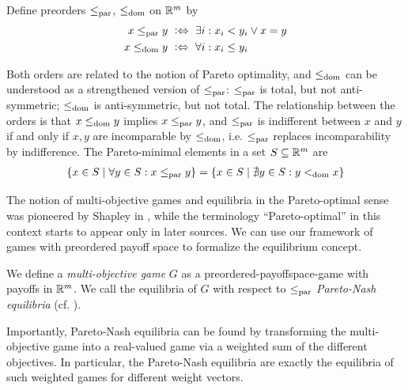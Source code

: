 \documentclass[a4paper]{scrreprt}
\begin{document}
    \begin{defn}
        Define preorders $\leq_{\text{par}}$, $\leq_{\text{dom}}$ on $\mathbb{R}^m$ by
        \begin{align*}
        	x \leq_{\text{par}} y ~ & \mathrel{\vcentcolon\Leftrightarrow}~ \exists i: x_i < y_i \vee x = y \\
        	x \leq_{\text{dom}} y ~    & \mathrel{\vcentcolon\Leftrightarrow}~ \forall i: x_i \leq y_i
        \end{align*}
    \end{defn}
    Both orders are related to the notion of Pareto optimality, and $\leq_{\text{dom}}$ can be understood as a strengthened version of $\leq_{\text{par}}$:
    $\leq_{\text{par}}$ is total, but not anti-symmetric; $\leq_{\text{dom}}$ is anti-symmetric, but not total.
    The relationship between the orders is that $x \leq_{\text{dom}} y$ implies $x \leq_{\text{par}} y$,
    and $\leq_{\text{par}}$ is indifferent between $x$ and $y$ if and only if $x, y$ are incomparable by $\leq_{\text{dom}}$, i.e. $\leq_{\text{par}}$ replaces incomparability by indifference.
    The Pareto-minimal elements in a set $S \subseteq \mathbb{R}^m$ are
    \begin{gather*}
        \{x \in S \mid \forall y \in S: x \leq_{\text{par}} y\} = \{x \in S \mid \nexists y \in S: y <_{\text{dom}} x\}
    \end{gather*}    
    
    The notion of multi-objective games and equilibria in the Pareto-optimal sense was pioneered by Shapley in \cite{bib:shapleyMultiobjectiveEquilibriumPoints},
    while the terminology “Pareto-optimal” in this context starts to appear only in later sources. %
    We can use our framework of games with preordered payoff space to formalize the equilibrium concept.
    
    \begin{defn}
        We define a \emph{multi-objective game} $G$ as a preordered-payoffspace-game with payoffs in $\mathbb{R}^m$.
        We call the equilibria of $G$ with respect to $\leq_{\text{par}}$ \emph{Pareto-Nash equilibria} (cf. \cite{bib:paretoNashEquilibria}).
    \end{defn}

    Importantly, Pareto-Nash equilibria can be found by transforming the multi-objective game into a real-valued game via a weighted sum of the different objectives. In particular, the Pareto-Nash equilibria are exactly the equilibria of such weighted games for different weight vectors.
    
\end{document}

